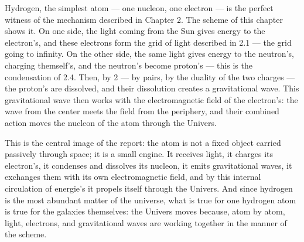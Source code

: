 \documentclass[12pt, letterpaper]{article}
\begin{document}
	Hydrogen, the simplest atom — one nucleon, one electron — is the perfect witness of the mechanism described in Chapter 2. The scheme of this chapter shows it. On one side, the light coming from the Sun gives energy to the electron's, and these electrons form the grid of light described in 2.1 — the grid going to infinity. On the other side, the same light gives energy to the neutron's, charging themself's, and the neutron's become proton's — this is the condensation of 2.4. Then, by 2 — by pairs, by the duality of the two charges — the proton's are dissolved, and their dissolution creates a gravitational wave. This gravitational wave then works with the electromagnetic field of the electron's: the wave from the center meets the field from the periphery, and their combined action moves the nucleon of the atom through the Univers.
	
	This is the central image of the report: the atom is not a fixed object carried passively through space; it is a small engine. It receives light, it charges its electron's, it condenses and dissolves its nucleon, it emits gravitational waves, it exchanges them with its own electromagnetic field, and by this internal circulation of energie's it propels itself through the Univers. And since hydrogen is the most abundant matter of the universe, what is true for one hydrogen atom is true for the galaxies themselves: the Univers moves because, atom by atom, light, electrons, and gravitational waves are working together in the manner of the scheme.
	
	\newline\newline\newline\newline\newline\newline\newline\newline\newline\newline
\end{document}
